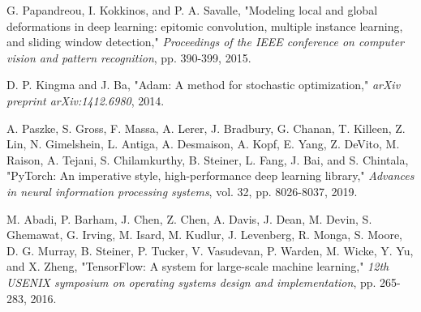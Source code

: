 \begin{thebibliography}{99}
G. Papandreou, I. Kokkinos, and P. A. Savalle, "Modeling local and global deformations in deep learning: epitomic convolution, multiple instance learning, and sliding window detection," \textit{Proceedings of the IEEE conference on computer vision and pattern recognition}, pp. 390-399, 2015.

D. P. Kingma and J. Ba, "Adam: A method for stochastic optimization," \textit{arXiv preprint arXiv:1412.6980}, 2014.

A. Paszke, S. Gross, F. Massa, A. Lerer, J. Bradbury, G. Chanan, T. Killeen, Z. Lin, N. Gimelshein, L. Antiga, A. Desmaison, A. Kopf, E. Yang, Z. DeVito, M. Raison, A. Tejani, S. Chilamkurthy, B. Steiner, L. Fang, J. Bai, and S. Chintala, "PyTorch: An imperative style, high-performance deep learning library," \textit{Advances in neural information processing systems}, vol. 32, pp. 8026-8037, 2019.

M. Abadi, P. Barham, J. Chen, Z. Chen, A. Davis, J. Dean, M. Devin, S. Ghemawat, G. Irving, M. Isard, M. Kudlur, J. Levenberg, R. Monga, S. Moore, D. G. Murray, B. Steiner, P. Tucker, V. Vasudevan, P. Warden, M. Wicke, Y. Yu, and X. Zheng, "TensorFlow: A system for large-scale machine learning," \textit{12th USENIX symposium on operating systems design and implementation}, pp. 265-283, 2016.

\end{thebibliography}
